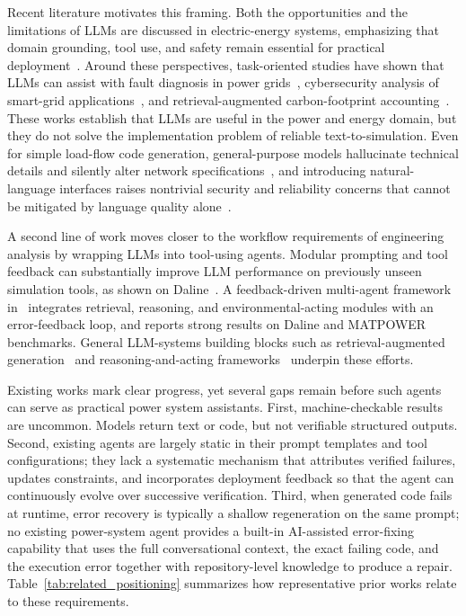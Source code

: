 \documentclass[journal]{IEEEtran}
\begin{document}
Recent literature motivates this framing.
Both the opportunities and the limitations of LLMs are discussed in electric-energy systems, emphasizing that domain grounding, tool use, and safety remain essential for practical deployment~\cite{majumder2024exploring, huang2024large}.
Around these perspectives, task-oriented studies have shown that LLMs can assist with fault diagnosis in power grids~\cite{jing2024fault}, cybersecurity analysis of smart-grid applications~\cite{zaboli2024chatgpt}, and retrieval-augmented carbon-footprint accounting~\cite{wang2024carbon}.
These works establish that LLMs are useful in the power and energy domain, but they do not solve the implementation problem of reliable text-to-simulation.
Even for simple load-flow code generation, general-purpose models hallucinate technical details and silently alter network specifications~\cite{bonadia2023potential}, and introducing
natural-language interfaces raises nontrivial security and reliability concerns that cannot be mitigated by language quality alone~\cite{ruan2024threats}.


A second line of work moves closer to the workflow requirements of engineering analysis by wrapping LLMs into tool-using agents.
Modular prompting and tool feedback can substantially improve LLM performance on previously unseen simulation tools, as shown on Daline~\cite{jia2024daline}.
A feedback-driven multi-agent framework in~\cite{jia2025enhancing} integrates retrieval, reasoning, and environmental-acting modules with an error-feedback loop, and reports strong results on Daline and MATPOWER benchmarks.
General LLM-systems building blocks such as retrieval-augmented generation~\cite{lewis2020rag} and reasoning-and-acting frameworks~\cite{yao2023react} underpin these efforts.

Existing works mark clear progress, yet several gaps remain before such agents can serve as practical power system assistants.
%
First, machine-checkable results are uncommon. Models return text or code, but not verifiable structured outputs.
%
Second, existing agents are largely static in their prompt templates and tool configurations;
they lack a systematic mechanism that attributes verified failures, updates constraints, and incorporates deployment feedback so that the agent can continuously evolve over successive verification.
%
Third, when generated code fails at runtime, error recovery is typically a shallow regeneration on the same prompt;
no existing power-system agent provides a built-in AI-assisted error-fixing capability that uses the full conversational context, the exact failing code, and the execution error together with repository-level knowledge to produce a repair.
%
Table~\ref{tab:related_positioning} summarizes how representative prior works relate to these requirements.
\end{document}
